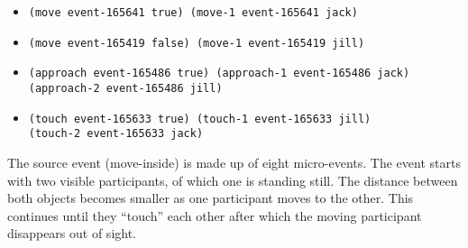 \begin{itemize}
 \item
\begin{lstlisting}
(move event-165641 true) (move-1 event-165641 jack)
\end{lstlisting}
\item
\begin{lstlisting}
(move event-165419 false) (move-1 event-165419 jill)
\end{lstlisting}
\item
\begin{lstlisting}
(approach event-165486 true) (approach-1 event-165486 jack)
(approach-2 event-165486 jill)
\end{lstlisting}
\item
\begin{lstlisting}
(touch event-165633 true) (touch-1 event-165633 jill)
(touch-2 event-165633 jack) 
\end{lstlisting}
\end{itemize}

 

The source event (move-inside) is made up of eight micro-events. The event starts with two visible participants, of which one is standing still. The distance between both objects becomes smaller as one participant moves to the other. This continues until they ``touch'' each other after which the moving participant disappears out of sight.\\

